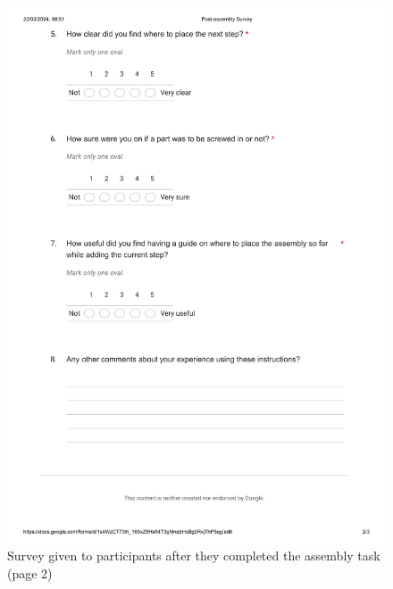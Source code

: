 \documentclass{l4proj}
\begin{document}
\begin{appendices}
\begin{figure}
    \centering
    \includegraphics[width=1\linewidth]{dissertation//images/postAssemblySurvey2.pdf}
    \caption{Survey given to participants after they completed the assembly task (page 2)}
\end{figure}


\end{appendices}
\end{document}
